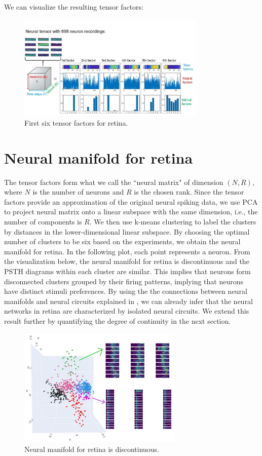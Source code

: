 We can visualize the resulting tensor factors:
\begin{figure}[H]
    \centering
        \includegraphics[width=0.8\textwidth]{figures/biological/retina-factors.jpg}
        \caption{First six tensor factors for retina.}
    \end{figure} 

\section{Neural manifold for retina}
The tensor factors form what we call the ``neural matrix" of dimension $(N,R)$, where $N$ is the number of neurons and $R$ is the chosen rank. Since the tensor factors provide an approximation of the original neural spiking data, we use PCA to project neural matrix onto a linear subspace with the same dimension, i.e., the number of components is $R$. We then use k-means clustering to label the clusters by distances in the lower-dimensional linear subspace. By choosing the optimal number of clusters to be six based on the experiments, we obtain the neural manifold for retina. In the following plot, each point represents a neuron. From the visualization below, the neural manifold for retina is discontinuous and the PSTH diagrams within each cluster are similar. This implies that neurons form disconnected clusters grouped by their firing patterns, implying that neurons have distinct stimuli preferences. By using the the connections between neural manifolds and neural circuits explained in \label{networks-manifolds}, we can already infer that the neural networks in retina are characterized by isolated neural circuits. We extend this result further by quantifying the degree of continuity in the next section.
  \begin{figure}[H]
        \centering
             \includegraphics[width=0.7\textwidth]{figures/biological/retina-manifold-with-psth.jpg}
            \caption{Neural manifold for retina is discontinuous.}
        \end{figure} 


